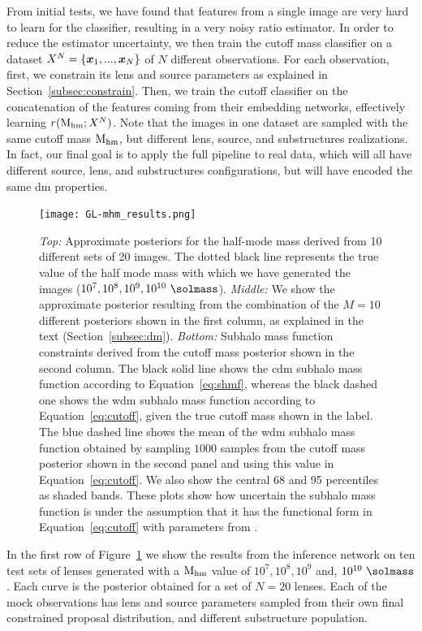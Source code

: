 From initial tests, we have found that features from a single image are very hard to learn for the classifier, resulting in a very noisy ratio estimator.
In order to reduce the estimator uncertainty, we then train the cutoff mass classifier on a dataset $X^N=\{\bm{x}_1, ..., \bm{x}_N\}$ of $N$ different observations. For each observation, first, we constrain its lens and source parameters as explained in Section~\ref{subsec:constrain}. Then, we train the cutoff classifier on the concatenation of the features coming from their embedding networks, effectively learning $r(\mathrm{M_{hm}}; X^N)$. 
Note that the images in one dataset are sampled with the same cutoff mass $\mathrm{M_{hm}}$, but different lens, source, and substructures realizations. In fact, our final goal is to apply the full pipeline to real data, which will all have different source, lens, and substructures configurations, but will have encoded the same \gls*{dm} properties. 

\begin{figure}
\centering
\texttt{[image: GL-mhm\_results.png]}
\caption{\textit{Top:} Approximate posteriors for the half-mode mass derived from 10 different sets of 20 images. The dotted black line represents the true value of the half mode mass with which we have generated the images ($10^7, 10^8, 10^9,  10^{10} \ \si{\solmass}$). 
\textit{Middle:} We show the approximate posterior resulting from the combination of the $M=10$ different posteriors shown in the first column, as explained in the text (Section~\ref{subsec:dm}).
\textit{Bottom:} Subhalo mass function constraints derived from the cutoff mass posterior shown in the second column. The black solid line shows the \gls*{cdm} subhalo mass function according to Equation~\eqref{eq:shmf}, whereas the black dashed one shows the \gls*{wdm} subhalo mass function according to Equation~\eqref{eq:cutoff}, given the true cutoff mass shown in the label. The blue dashed line shows the mean of the \gls*{wdm} subhalo mass function obtained by sampling $1000$ samples from the cutoff mass posterior shown in the second panel and using this value in Equation~\eqref{eq:cutoff}. We also show the central \num{68} and \num{95} percentiles as shaded bands. These plots show how uncertain the subhalo mass function is under the assumption that it has the functional form in Equation~\eqref{eq:cutoff} with parameters from \cite{Lovell:2020bcy}.
}
\label{fig:mhm_results}
\end{figure}

In the first row of Figure~\ref{fig:mhm_results} we show the results from the inference network on ten test sets of lenses generated with a $\mathrm{M_{hm}}$ value of $10^7, 10^8, 10^9$ and, $10^{10} \ \si{\solmass}$. Each curve is the posterior obtained for a set of $N=20$ lenses. Each of the mock observations has lens and source parameters sampled from their own final constrained proposal distribution, and different substructure population.  

